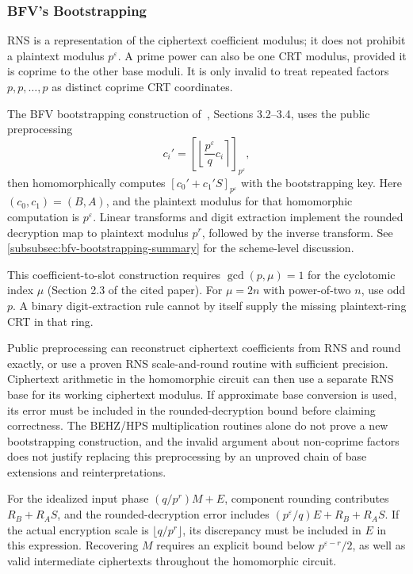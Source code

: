 \subsubsection{BFV's Bootstrapping}
\label{subsubsec:rns-bfv-bootstrapping}

RNS is a representation of the ciphertext coefficient modulus; it does not prohibit a plaintext modulus $p^\varepsilon$. A prime power can also be one CRT modulus, provided it is coprime to the other base moduli. It is only invalid to treat repeated factors $p,p,\ldots,p$ as distinct coprime CRT coordinates.

The BFV bootstrapping construction of~\cite{cryptoeprint:2022/1363}, Sections 3.2--3.4, uses the public preprocessing
\[
c_i'=\left[\left\lfloor\frac{p^\varepsilon}{q}c_i\right\rceil\right]_{p^\varepsilon},
\]
then homomorphically computes $[c_0'+c_1'S]_{p^\varepsilon}$ with the bootstrapping key. Here $(c_0,c_1)=(B,A)$, and the plaintext modulus for that homomorphic computation is $p^\varepsilon$. Linear transforms and digit extraction implement the rounded decryption map to plaintext modulus $p^r$, followed by the inverse transform. See \autoref{subsubsec:bfv-bootstrapping-summary} for the scheme-level discussion.

This coefficient-to-slot construction requires $\gcd(p,\mu)=1$ for the cyclotomic index $\mu$ (Section 2.3 of the cited paper). For $\mu=2n$ with power-of-two $n$, use odd $p$. A binary digit-extraction rule cannot by itself supply the missing plaintext-ring CRT in that ring.

Public preprocessing can reconstruct ciphertext coefficients from RNS and round exactly, or use a proven RNS scale-and-round routine with sufficient precision. Ciphertext arithmetic in the homomorphic circuit can then use a separate RNS base for its working ciphertext modulus. If approximate base conversion is used, its error must be included in the rounded-decryption bound before claiming correctness. The BEHZ/HPS multiplication routines alone do not prove a new bootstrapping construction, and the invalid argument about non-coprime factors does not justify replacing this preprocessing by an unproved chain of base extensions and reinterpretations.

For the idealized input phase $(q/p^r)M+E$, component rounding contributes $R_B+R_AS$, and the rounded-decryption error includes $(p^\varepsilon/q)E+R_B+R_AS$. If the actual encryption scale is $\lfloor q/p^r\rfloor$, its discrepancy must be included in $E$ in this expression. Recovering $M$ requires an explicit bound below $p^{\varepsilon-r}/2$, as well as valid intermediate ciphertexts throughout the homomorphic circuit.

